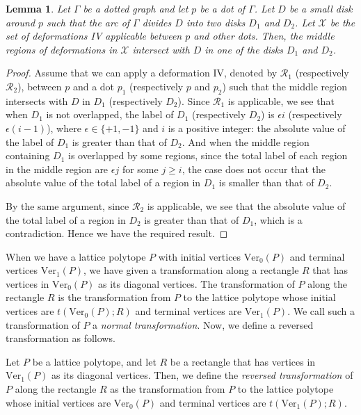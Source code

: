 \documentclass[a4paper,11pt]{amsart}
\numberwithin{equation}{section}
\newtheorem{lemma}[theorem]{Lemma}
\begin{document}
\begin{lemma}\label{lem0901}
Let $\Gamma$ be a dotted graph and let $p$ be a dot of $\Gamma$. Let $D$ be a small disk around $p$ such that the arc of $\Gamma$ divides $D$ into two disks $D_1$ and $D_2$. Let $\mathcal{X}$ be the set of  deformations  IV applicable between $p$ and other dots. Then, the middle regions of deformations in $\mathcal{X}$ intersect 
with $D$ in one of the disks $D_1$ and $D_2$. 
\end{lemma}

\begin{proof}
Assume that we can apply a deformation IV, denoted by $\mathcal{R}_1$ (respectively $\mathcal{R}_2$), between $p$ and a dot $p_1$ (respectively $p$ and $p_2$) such that the middle region intersects with $D$ in $D_1$ (respectively $D_2$). 
Since $\mathcal{R}_1$ is applicable, we see that when $D_1$ is not overlapped, the label of $D_1$ (respectively $D_2$) is $\epsilon i$ (respectively $\epsilon (i-1)$), where $\epsilon \in \{+1, -1\}$ and $i$ is a positive integer: 
the absolute value of the label of $D_1$ is greater than that of $D_2$. 
And when the middle region containing $D_1$ is overlapped by some regions, since the total label of each region in the middle region are  $\epsilon j$ for some $j\geq i$, the case does not occur that the absolute value of the total label of a region in $D_1$ is smaller than that of $D_2$. 

By the same argument, since $\mathcal{R}_2$ is applicable, we see that the absolute value of the total label of a region in $D_2$ is greater than that of $D_1$, which is a contradiction. 
Hence we have the required result. 
\end{proof}

         
  


When we have a lattice polytope $P$ with initial vertices $\mathrm{Ver}_0(P)$ and terminal vertices $\mathrm{Ver}_1(P)$, 
we have given a transformation along a rectangle $R$ that has vertices in $\mathrm{Ver}_0(P)$ as its diagonal vertices. 
The transformation of $P$ along the rectangle $R$ is 
the transformation from $P$ to the lattice polytope whose initial vertices  are $t(\mathrm{Ver}_0(P); R)$ and terminal vertices are $\mathrm{Ver}_1(P)$. 
We call such a transformation of $P$ a {\it normal transformation}. 
Now, we define a reversed transformation as follows. 
\begin{definition}\label{def818}
Let $P$ be a lattice polytope, and let $R$ be 
a rectangle that has vertices in $\mathrm{Ver}_1(P)$ as its diagonal vertices. 
Then, we define the {\it reversed transformation} of $P$ along the rectangle $R$ as
the transformation from $P$ to the lattice polytope whose initial vertices  are $\mathrm{Ver}_0(P)$ and terminal vertices are $t(\mathrm{Ver}_1(P); R)$. 
\end{definition}
\end{document}
